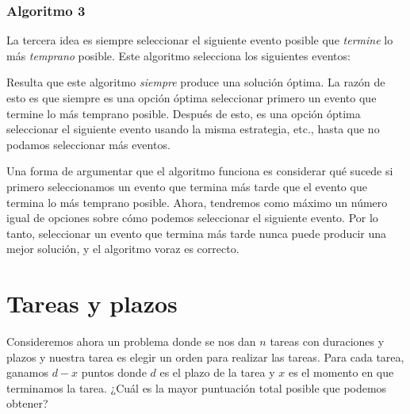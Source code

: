 \subsubsection*{Algoritmo 3}

La tercera idea es siempre seleccionar el siguiente
evento posible que \emph{termine} lo más \emph{temprano} posible.
Este algoritmo selecciona los siguientes eventos: 
\begin{center}
\end{center}

Resulta que este algoritmo
\emph{siempre} produce una solución óptima.
La razón de esto es que siempre es una opción óptima
seleccionar primero un evento que termine
lo más temprano posible.
Después de esto, es una opción óptima
seleccionar el siguiente evento
usando la misma estrategia, etc.,
hasta que no podamos seleccionar más eventos.

Una forma de argumentar que el algoritmo funciona
es considerar
qué sucede si primero seleccionamos un evento
que termina más tarde que el evento que termina
lo más temprano posible.
Ahora, tendremos como máximo un número igual de
opciones sobre cómo podemos seleccionar el siguiente evento.
Por lo tanto, seleccionar un evento que termina más tarde
nunca puede producir una mejor solución,
y el algoritmo voraz es correcto.

\section{Tareas y plazos}

Consideremos ahora un problema donde
se nos dan $n$ tareas con duraciones y plazos
y nuestra tarea es elegir un orden para realizar las tareas.
Para cada tarea, ganamos $d-x$ puntos
donde $d$ es el plazo de la tarea
y $x$ es el momento en que terminamos la tarea.
¿Cuál es la mayor puntuación total posible
que podemos obtener?

